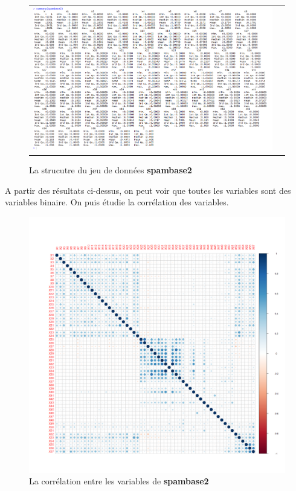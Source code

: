 \documentclass[a4paper,11pt,oneside,roman]{article}
\begin{document}
\begin{figure}[htb]
\begin{tabular}{cc}
    \includegraphics[scale = .3]{./discrimination/spambase2/summary.PNG}
    \end{tabular}
    \caption{La strucutre du jeu de données \textbf{spambase2}}
    \label{fig:my_label}
\end{figure}
A partir des résultats ci-dessus, on peut voir que toutes les variables sont des variables binaire. On puis étudie la corrélation des variables.
\newline
\begin{figure}[htb]
    \centering
    \includegraphics[scale = .2]{./discrimination/spambase2/corrplot.png} 
    \caption{La corrélation entre les variables de \textbf{spambase2}}
    \label{my_label}
\end{figure}
\end{document}
